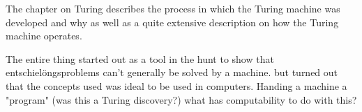 \documentclass{article}
\begin{document}
   The chapter on Turing describes the process in which the Turing machine was
   developed and why as well as a quite extensive description on how the Turing machine
   operates.

   The entire thing started out as a tool in the hunt to show that
   entschielöngsproblems can't generally be solved by a machine. but turned out that the
   concepts used was ideal to be used in computers. Handing a machine a
   "program" (was this a Turing discovery?) what has computability to do with
   this? 
\end{document}
